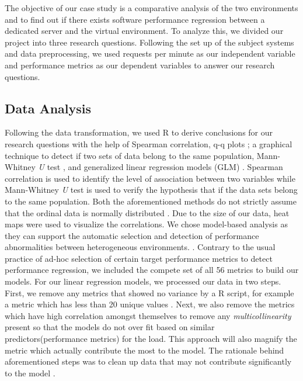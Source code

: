 The objective of our case study is a comparative analysis of the two environments and to find out if there exists software performance regression between a dedicated server and the virtual environment. To analyze this, we divided our project into three research questions. Following the set up of the subject systems and data preprocessing, we used requests per minute as our independent variable and performance metrics as our dependent variables to answer our research questions. %

\subsection{\textbf{Data Analysis}}
Following the data transformation, we used R \cite{R} to derive conclusions for our research questions with the help of Spearman correlation, q-q plots \cite{qqplots}; a graphical technique to detect if two sets of data belong to the same population, Mann-Whitney \textit{U} test \cite{mannwhitney}, and generalized linear regression models (GLM) \cite{SanFranciscoStateUniversity}. Spearman correlation is used to identify the level of association between two variables while Mann-Whitney \textit{U} test is used to verify the hypothesis that if the data sets belong to the same population.
Both the aforementioned methods do not strictly assume that the ordinal data is normally distributed \cite{spearman} \cite{manutest}. Due to the size of our data, heat maps \cite{heatmaps} were used to visualize the correlations. We chose model-based analysis as they can support the automatic selection and detection of performance abnormalities between heterogeneous environments. \cite{Shang:2015:ADP:2668930.2688052}\cite{Nguyen:2012:ADP:2188286.2188344}. Contrary to the usual practice of ad-hoc selection of certain target performance metrics \cite{heger2013automated} to detect performance regression, we included the compete set of all 56 metrics to build our models. For our linear regression models, we processed our data in two steps. First, we remove any metrics that showed no variance by a R script, for example a metric which has less than 20 unique values \cite{rahm2000data}. Next, we also remove the metrics which have high correlation amongst themselves to remove any \textit{multicollinearity} present \cite{mansfield1982detecting} so that the models do not over fit based on similar predictors(performance metrics) for the load. This approach will also magnify the metric which actually contribute the most to the model. The rationale behind aforementioned steps was to clean up data that may not contribute significantly to the model \cite{Shihab:2010:UIC:1852786.1852792}. 



